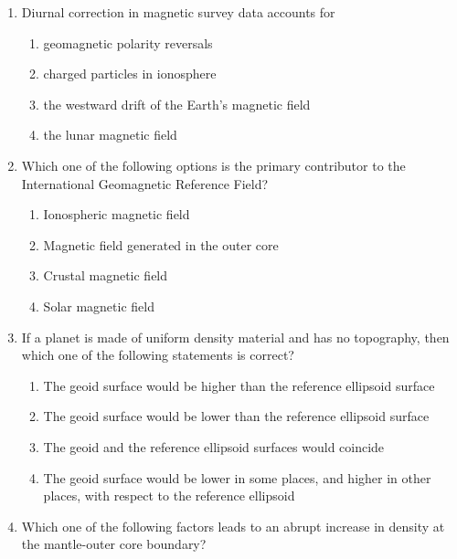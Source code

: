 \documentclass[journal,12pt,onecolumn]{IEEEtran}
\theoremstyle{remark}
\begin{document}
\begin{enumerate}
\item Diurnal correction in magnetic survey data accounts for  \hfill{}
\begin{enumerate}
    \item geomagnetic polarity reversals
    \item charged particles in ionosphere
    \item the westward drift of the Earth's magnetic field
    \item the lunar magnetic field
\end{enumerate}

\item Which one of the following options is the primary contributor to the International Geomagnetic Reference Field? \hfill{}
\begin{enumerate}
    \item Ionospheric magnetic field
    \item Magnetic field generated in the outer core
    \item Crustal magnetic field
    \item Solar magnetic field
\end{enumerate}

\item If a planet is made of uniform density material and has no topography, then which one of the following statements is correct? \hfill{}
\begin{enumerate}
    \item The geoid surface would be higher than the reference ellipsoid surface
    \item The geoid surface would be lower than the reference ellipsoid surface
    \item The geoid and the reference ellipsoid surfaces would coincide
    \item The geoid surface would be lower in some places, and higher in other places, with respect to the reference ellipsoid
\end{enumerate}

\item Which one of the following factors leads to an abrupt increase in density at the mantle-outer core boundary? \hfill{}
\begin{enumerate}
\end{enumerate}


\end{enumerate}
\end{document}
